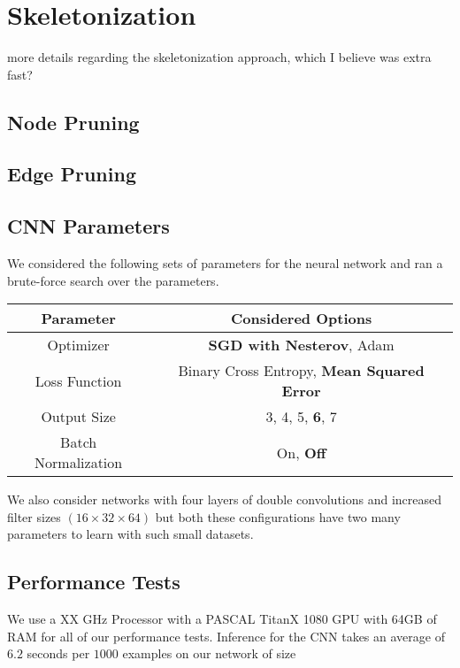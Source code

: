 \section{Skeletonization}

more details regarding the skeletonization approach, which I believe was extra fast?

\subsection{Node Pruning}

\subsection{Edge Pruning}

\subsection{CNN Parameters}

We considered the following sets of parameters for the neural network and ran a brute-force search over the parameters.

\begin{table}
	\footnotesize
	\begin{tabular}{c c} \hline
		\textbf{Parameter} & \textbf{Considered Options} \\ \hline
		Optimizer & \textbf{SGD with Nesterov}, Adam \\
		Loss Function & Binary Cross Entropy, \textbf{Mean Squared Error} \\
		Output Size & 3, 4, 5, \textbf{6}, 7 \\
		Batch Normalization & On, \textbf{Off} \\ \hline
	\end{tabular}
\end{table}

We also consider networks with four layers of double convolutions and increased filter sizes $(16\times32\times64)$ but both these configurations have two many parameters to learn with such small datasets. 

\subsection{Performance Tests}

We use a XX GHz Processor with a PASCAL TitanX 1080 GPU with 64GB of RAM for all of our performance tests. 
Inference for the CNN takes an average of $6.2$ seconds per $1000$ examples on our network of size 

